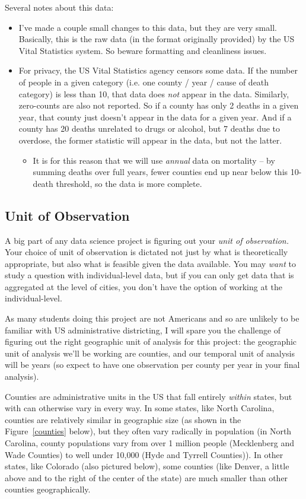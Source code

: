\documentclass[12pt]{article}
\begin{document}
Several notes about this data:
\begin{itemize}
  \item I've made a couple small changes to this data, but they are very small. Basically, this is the raw data (in the format originally provided) by the US Vital Statistics system. So beware formatting and cleanliness issues.
  \item For privacy, the US Vital Statistics agency censors some data. If the number of people in a given category (i.e. one county / year / cause of death category) is less than 10, that data does \emph{not} appear in the data. Similarly, zero-counts are also not reported. So if a county has only 2 deaths in a given year, that county just doesn't appear in the data for a given year. And if a county has 20 deaths unrelated to drugs or alcohol, but 7 deaths due to overdose, the former statistic will appear in the data, but not the latter.
  \begin{itemize}
    \item It is for this reason that we will use \emph{annual} data on mortality -- by summing deaths over full years, fewer counties end up near below this 10-death threshold, so the data is more complete.
  \end{itemize}
\end{itemize}


\subsection*{Unit of Observation}

A big part of any data science project is figuring out your \emph{unit of observation.} Your choice of unit of observation is dictated not just by what is theoretically appropriate, but also what is feasible given the data available. You may \emph{want} to study a question with individual-level data, but if you can only get data that is aggregated at the level of cities, you don't have the option of working at the individual-level.

As many students doing this project are not Americans and so are unlikely to be familiar with US administrative districting, I will spare you the challenge of figuring out the right geographic unit of analysis for this project: the geographic unit of analysis we'll be working are counties, and our temporal unit of analysis will be years (so expect to have one observation per county per year in your final analysis).

Counties are administrative units in the US that fall entirely \emph{within} states, but with can otherwise vary in every way. In some states, like North Carolina, counties are relatively similar in geographic size (as shown in the Figure~\ref{counties} below), but they often vary radically in population (in North Carolina, county populations vary from over 1 million people (Mecklenberg and Wade Counties) to well under 10,000 (Hyde and Tyrrell Counties)). In other states, like Colorado (also pictured below), some counties (like Denver, a little above and to the right of the center of the state) are much smaller than other counties geographically.
\end{document}

